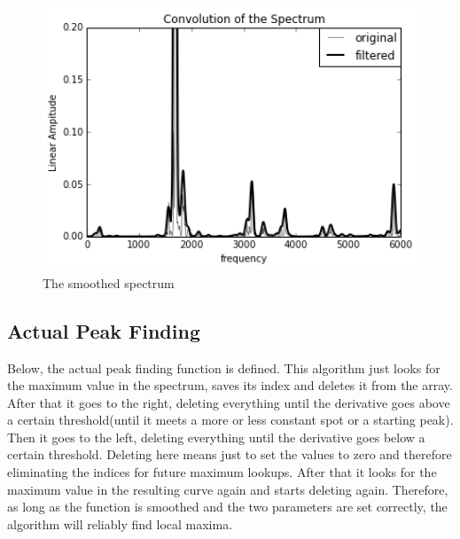 \begin{figure}[h]
    \begin{center}
        \includegraphics[width = 12cm]{BAK4_final_files/BAK4_final_16_0.png}
        \caption{The smoothed spectrum}
        \label{smoothSpectrum}
    \end{center}
\end{figure}



    
    \subsection{Actual Peak Finding}
\label{subsec:peakfinding}
    Below, the actual peak finding function is defined. This algorithm just looks for the maximum value in the spectrum, saves its index and deletes it from the array. After that it \glqq{}goes\grqq{} to the right, deleting everything until the derivative goes above a certain threshold(until it meets a more or less constant spot or a starting peak). Then it \glqq{}goes\grqq{} to the left, deleting everything until the derivative goes below a certain threshold. Deleting here means just to set the values to zero and therefore eliminating the indices for future maximum lookups. After that it looks for the maximum value in the resulting curve again and starts deleting again. Therefore, as long as the function is smoothed and the two parameters are set correctly, the algorithm will reliably find local maxima.

